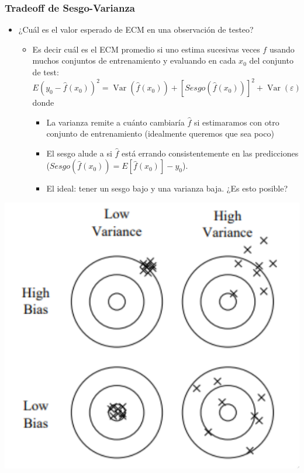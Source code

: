 \documentclass[leqno, 10pt, envcountsect]{beamer}
\numberwithin{equation}{section}
\theoremstyle{definition}
\theoremstyle{example}
\numberwithin{figure}{section}
\numberwithin{table}{section}
\let\olditem\item
\renewcommand{\item}{%
\olditem\vspace{1pt}}
\DeclareMathOperator{\var}{\mathrm{Var}}
\begin{document}
\begin{frame}[fragile=singleslide]
  \frametitle{Tradeoff de Sesgo-Varianza}
  \begin{itemize}
    \item ¿Cuál es el valor esperado de ECM en una observación de testeo?
      \begin{itemize}
        \item Es decir cuál es el ECM promedio si uno estima sucesivas veces
          $f$ usando muchos conjuntos de entrenamiento y evaluando en cada $x_{0}$
            del conjunto de test:
      \begin{equation*}
        E(y_{0} - \hat{f}(x_{0}))^{2} = \var(\hat{f}(x_{0})) +
        \left[Sesgo(\hat{f}(x_{0}))\right]^{2} + \var(\varepsilon)
      \end{equation*}
      donde
      \begin{itemize}
        \item La varianza remite a cuánto cambiaría $\hat{f}$ si estimaramos
          con otro conjunto de entrenamiento (idealmente queremos que sea
          poco)
        \item El sesgo alude a si $\hat{f}$ está errando consistentemente en
          las predicciones ($Sesgo(\hat{f}(x_{0})) = E[\hat{f}(x_{0})] -
          y_{0}$).
        \item El ideal: tener un sesgo bajo y una varianza baja. ¿Es esto
          posible?
      \end{itemize}
  \end{itemize}
  \end{itemize}
  \begin{center}
    \includegraphics[scale=0.2]{bias_variance_tradeoff.png}
  \end{center}
\end{frame}
\end{document}
